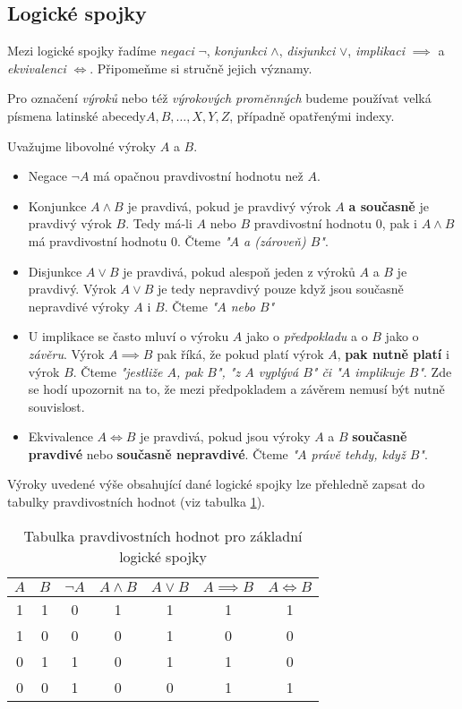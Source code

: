 \subsection{Logické spojky}\label{subsec:logicke_spojky}
Mezi logické spojky řadíme \emph{negaci} $\neg$, \emph{konjunkci} $\land$, \emph{disjunkci} $\lor$, \emph{implikaci} $\implies$ a \emph{ekvivalenci} $\iff$. Připomeňme si stručně jejich významy.
\begin{convention}
    \label{conv:abeceda_vyrokovych_promennych}
    Pro označení \emph{výroků} nebo též \emph{výrokových proměnných} budeme používat velká písmena latinské abecedy\linebreak $A,B,\dots,X,Y,Z$, případně opatřenými indexy.
\end{convention}
Uvažujme libovolné výroky $A$ a $B$.
\begin{itemize}
    \item Negace $\neg A$ má opačnou pravdivostní hodnotu než $A$.
    \item Konjunkce $A \land B$ je pravdivá, pokud je pravdivý výrok $A$ \textbf{a současně} je pravdivý výrok $B$. Tedy má-li $A$ nebo $B$ pravdivostní hodnotu 0, pak i $A \land B$ má pravdivostní hodnotu 0. Čteme \emph{"$A$ a (zároveň) $B$"}.
    \item Disjunkce $A \lor B$ je pravdivá, pokud alespoň jeden z výroků $A$ a $B$ je pravdivý. Výrok $A \lor B$ je tedy nepravdivý pouze když jsou současně nepravdivé výroky $A$ i $B$. Čteme \emph{"$A$ nebo $B$"}
    \item U implikace se často mluví o výroku $A$ jako o \emph{předpokladu} a o $B$ jako o \emph{závěru}. Výrok $A \implies B$ pak říká, že pokud platí výrok $A$, \textbf{pak nutně platí} i výrok $B$. Čteme \emph{"jestliže $A$, pak $B$", "z $A$ vyplývá $B$" či "$A$ implikuje $B$"}. Zde se hodí upozornit na to, že mezi předpokladem a závěrem nemusí být nutně souvislost.
    \item Ekvivalence $A \iff B$ je pravdivá, pokud jsou výroky $A$ a $B$ \textbf{současně pravdivé} nebo \textbf{současně nepravdivé}. Čteme \emph{"$A$ právě tehdy, když $B$"}.
\end{itemize}
Výroky uvedené výše obsahující dané logické spojky lze přehledně zapsat do tabulky pravdivostních hodnot (viz tabulka \ref{tab:logicke_spojky}).
\begin{table}[H]
    \centering
    \begin{tabular}{|cc|ccccc|}
    \hline
    $A$ & $B$ & $\neg A$ & $A \land B$ & $A \lor B$ & $A \implies B$ & $A \iff B$ \\ \hline
    1   & 1   & 0        & 1           & 1          & 1              & 1          \\
    1   & 0   & 0        & 0           & 1          & 0              & 0          \\
    0   & 1   & 1        & 0           & 1          & 1              & 0          \\
    0   & 0   & 1        & 0           & 0          & 1              & 1          \\ \hline
    \end{tabular}
    \caption{Tabulka pravdivostních hodnot pro základní logické spojky}
    \label{tab:logicke_spojky}
\end{table}
